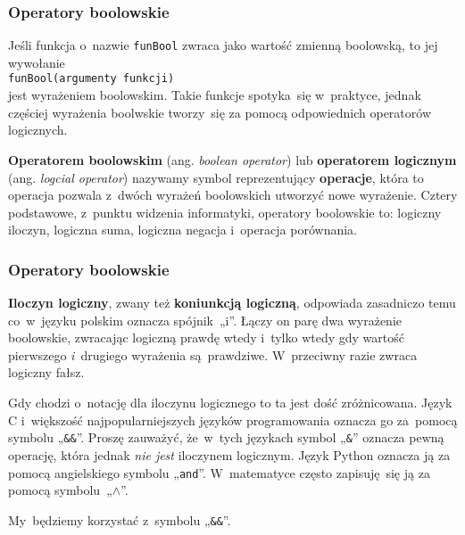 \documentclass[10pt,t]{beamer}
\begin{document}
\begin{frame}
  \frametitle{Operatory boolowskie}


  Jeśli funkcja o~nazwie \texttt{funBool} zwraca jako wartość zmienną
  boolowską, to jej wywołanie \\
  \texttt{funBool(argumenty funkcji)} \\
  jest wyrażeniem boolowskim. Takie funkcje spotyka~się w~praktyce, jednak
  częściej wyrażenia boolwskie tworzy~się za pomocą odpowiednich operatorów
  logicznych.

  \textbf{Operatorem boolowskim} (ang. \textit{boolean operator}) lub
  \textbf{operatorem logicznym} (ang. \textit{logcial operator})
  nazywamy symbol reprezentujący \textbf{operacje}, która to operacja
  pozwala z~dwóch wyrażeń boolowskich utworzyć nowe wyrażenie. Cztery
  podstawowe, z~punktu widzenia informatyki, operatory boolowskie to:
  logiczny iloczyn, logiczna suma, logiczna negacja i~operacja porównania.

\end{frame}





\begin{frame}
  \frametitle{Operatory boolowskie}


  \textbf{Iloczyn logiczny}, zwany też \textbf{koniunkcją logiczną},
  odpowiada zasadniczo temu co~w~języku polskim oznacza spójnik~„i”. Łączy
  on parę dwa wyrażenie boolowskie, zwracając logiczną prawdę wtedy i~tylko
  wtedy gdy wartość pierwszego \textit{i}~drugiego wyrażenia są~prawdziwe.
  W~przeciwny razie zwraca logiczny fałsz.

  Gdy chodzi o~notację dla iloczynu logicznego to ta jest dość zróżnicowana.
  Język C i~większość najpopularniejszych języków programowania oznacza
  go za~pomocą symbolu „\texttt{\&\&}”. Proszę zauważyć, że~w~tych językach
  symbol „\texttt{\&}” oznacza pewną operację, która jednak \textit{nie
    jest} iloczynem logicznym. Język Python oznacza ją za pomocą
  angielskiego symbolu „\texttt{and}”. W~matematyce często zapisuję~się ją
  za pomocą symbolu~„$\wedge$”.

  My~będziemy korzystać z~symbolu „\texttt{\&\&}”.

\end{frame}
\end{document}
